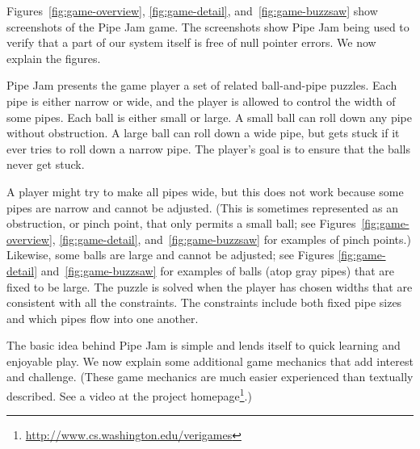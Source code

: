 \documentclass{sig-alternate}
\begin{document}
Figures~\ref{fig:game-overview}, \ref{fig:game-detail},
and~\ref{fig:game-buzzsaw} show screenshots of the Pipe Jam game.  The
screenshots show Pipe Jam being used to verify that a part of our system
itself is free of null pointer errors.  We now explain the figures.

Pipe Jam presents the game player a set of related ball-and-pipe
puzzles.  Each pipe is either narrow or wide, and the player is
allowed to control the width of some pipes.  Each ball is either small
or large.  A small ball can roll down any pipe without obstruction.  A
large ball can roll down a wide pipe, but gets stuck if it ever tries
to roll down a narrow pipe.  The player's goal is to ensure that the
balls never get stuck.

A player might try to make all pipes wide, but this does not work
because some pipes are narrow and cannot be adjusted.  (This is
sometimes represented as an obstruction, or pinch point, that only
permits a small ball; see Figures~\ref{fig:game-overview},
\ref{fig:game-detail}, and~\ref{fig:game-buzzsaw} for examples of
pinch points.)  Likewise, some balls are large and cannot be adjusted;
see Figures \ref{fig:game-detail} and~\ref{fig:game-buzzsaw} for
examples of balls (atop gray pipes) that are fixed to be large.  The
puzzle is solved when the player has chosen widths that are consistent
with all the constraints.  The constraints include both fixed pipe sizes
and which pipes
flow into one another.

The basic idea behind Pipe Jam is simple and lends itself to quick
learning and enjoyable play.  We now explain some additional game
mechanics that add interest and challenge.  (These game mechanics are
much easier experienced than textually described. See a video at the
project homepage\footnote{\url{http://www.cs.washington.edu/verigames}}.)
\end{document}
